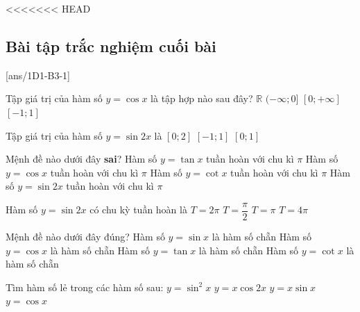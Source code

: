 <<<<<<< HEAD
\subsection{Bài tập trắc nghiệm cuối bài}
\TN
\setcounter{ex}{0}
[ans/1D1-B3-1]
\begin{ex}%
	Tập giá trị của hàm số $y= \cos x$ là tập hợp nào sau đây?
	\choice
	{$\mathbb{R}$}
	{$(-\infty; 0]$}
	{$[0; +\infty]$}
	{\True $ [-1; 1]$}
\end{ex}

\begin{ex}%
	Tập giá trị của hàm số $y=\sin 2x$ là
	\choice{$[-2;2]$}
	{$[0;2]$}
	{\True $[-1;1]$}
	{$[0;1]$}
\end{ex}

\begin{ex}%
	Mệnh đề nào dưới đây \textbf{sai}?
	\choice
	{Hàm số $y=\tan x$ tuần hoàn với chu kì $\pi$}
	{\True Hàm số $y=\cos x$ tuần hoàn với chu kì $\pi$}
	{Hàm số $y=\cot x$ tuần hoàn với chu kì $\pi$}
	{Hàm số $y=\sin2x$ tuần hoàn với chu kì $\pi$}
\end{ex}

\begin{ex}%
	Hàm số $y=\sin 2x$ có chu kỳ tuần hoàn là
	\choice
	{$T=2\pi$}
	{$T=\dfrac{\pi}{2}$}
	{\True $T=\pi$}
	{$T=4\pi$}
\end{ex}

\begin{ex}%
	Mệnh đề nào dưới đây đúng?
	\choice
	{Hàm số $y=\sin x$ là hàm số chẵn}
	{\True Hàm số $y=\cos x$ là hàm số chẵn}
	{Hàm số $y=\tan x$ là hàm số chẵn}
	{Hàm số $y=\cot x$ là hàm số chẵn}
\end{ex}

\begin{ex}%
	Tìm hàm số lẻ trong các hàm số sau:
	\choice
	{$y=\sin^2x$}
	{\True $y=x\cos2x$}
	{ $y=x\sin x$}
	{$y=\cos x$}	
	
\end{ex}

